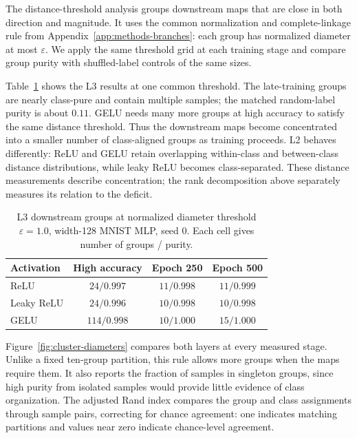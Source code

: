 The distance-threshold analysis groups downstream maps that are close in both direction and magnitude. It uses the common normalization and complete-linkage rule from Appendix~\ref{app:methods-branches}: each group has normalized diameter at most $\varepsilon$. We apply the same threshold grid at each training stage and compare group purity with shuffled-label controls of the same sizes.

Table~\ref{tab:dmap-threshold} shows the L3 results at one common threshold. The late-training groups are nearly class-pure and contain multiple samples; the matched random-label purity is about $0.11$. GELU needs many more groups at high accuracy to satisfy the same distance threshold. Thus the downstream maps become concentrated into a smaller number of class-aligned groups as training proceeds. L2 behaves differently: ReLU and GELU retain overlapping within-class and between-class distance distributions, while leaky ReLU becomes class-separated. These distance measurements describe concentration; the rank decomposition above separately measures its relation to the deficit.

\begin{table}[!htbp]\centering
\caption{L3 downstream groups at normalized diameter threshold $\varepsilon=1.0$, width-128 MNIST MLP, seed 0. Each cell gives number of groups / purity.}
\label{tab:dmap-threshold}
\begin{tabular}{lccc}\toprule
Activation & High accuracy & Epoch 250 & Epoch 500\\\midrule
ReLU & $24/0.997$ & $11/0.998$ & $11/0.999$\\
Leaky ReLU & $24/0.996$ & $10/0.998$ & $10/0.998$\\
GELU & $114/0.998$ & $10/1.000$ & $15/1.000$\\\bottomrule
\end{tabular}
\end{table}







Figure~\ref{fig:cluster-diameters} compares both layers at every measured stage. Unlike a fixed ten-group partition, this rule allows more groups when the maps require them. It also reports the fraction of samples in singleton groups, since high purity from isolated samples would provide little evidence of class organization. The adjusted Rand index compares the group and class assignments through sample pairs, correcting for chance agreement: one indicates matching partitions and values near zero indicate chance-level agreement.

